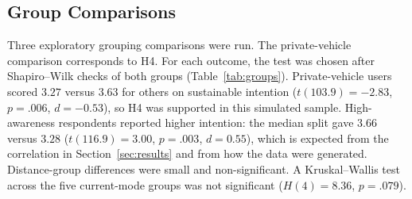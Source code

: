 \documentclass[11pt,a4paper]{article}
\begin{document}
\subsection{Group Comparisons}
Three exploratory grouping comparisons were run. The private-vehicle comparison corresponds to H4.
For each outcome, the test was chosen after Shapiro--Wilk checks of both groups
(Table~\ref{tab:groups}). Private-vehicle users scored $3.27$ versus $3.63$ for others on sustainable
intention ($t(103.9) = -2.83$, $p = .006$, $d = -0.53$), so H4 was supported in this simulated
sample. High-awareness respondents reported higher intention: the median split gave $3.66$ versus
$3.28$ ($t(116.9) = 3.00$, $p = .003$, $d = 0.55$), which is expected from the correlation in
Section~\ref{sec:results} and from how the data were generated. Distance-group
differences were small and non-significant. A Kruskal--Wallis test across the five current-mode
groups was not significant ($H(4) = 8.36$, $p = .079$).

\begin{table}[H]
\centering
\small
\caption{Group comparisons (simulated demonstration data, $N = 120$). Cells show $M$ ($SD$); share
variables are on a 0--1 scale and CO$_2$ saved is g per trip.}
\label{tab:groups}
\end{table}
\end{document}
